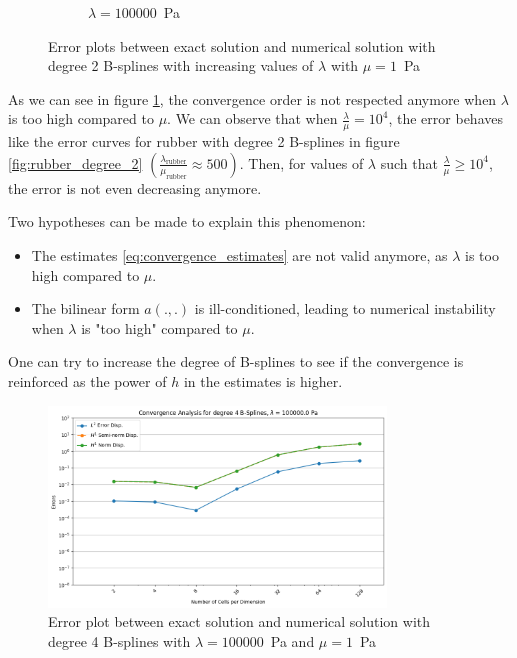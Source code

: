 \documentclass[a4paper,12pt,twoside]{report}
\begin{document}
\begin{figure}
\begin{subfigure}[b]{0.49\textwidth}
		\caption{$\lambda=100000$~Pa}
	\end{subfigure}
	\caption{Error plots between exact solution and numerical solution with degree 2 B-splines with increasing values of $\lambda$ with $\mu = 1$~Pa}
	\label{fig:error_kappa}
\end{figure}

As we can see in figure \ref{fig:error_kappa}, the convergence order is not respected anymore when $\lambda$ is too high compared to $\mu$. We can observe that when $\frac{\lambda}{\mu} = 10^4$, the error behaves like the error curves for rubber with degree 2 B-splines in figure \ref{fig:rubber_degree_2} $\displaystyle \left(\frac{\lambda_{\text{rubber}}}{\mu_{\text{rubber}}} \approx 500\right)$. Then, for values of $\lambda$ such that $\frac{\lambda}{\mu} \geq 10^4$, the error is not even decreasing anymore.

Two hypotheses can be made to explain this phenomenon: 
\begin{itemize}
	\item The estimates \eqref{eq:convergence_estimates} are not valid anymore, as $\lambda$ is too high compared to $\mu$.
	\item The bilinear form $a(.,.)$ is ill-conditioned, leading to numerical instability when $\lambda$ is "too high" compared to $\mu$.
\end{itemize}

One can try to increase the degree of B-splines to see if the convergence is reinforced as the power of $h$ in the estimates is higher. 

\begin{figure}[!h]
	\centering
	\includegraphics[width=0.8\textwidth]{figures/figures_increasing_lambda_non_mixed/convergence_plot_degree_4_lambda=100000.0.png}	
	\caption{Error plot between exact solution and numerical solution with degree 4 B-splines with $\lambda = 100000$~Pa and $\mu = 1$~Pa}
	\label{fig:error_kappa_degree_4}
\end{figure}
\end{document}
